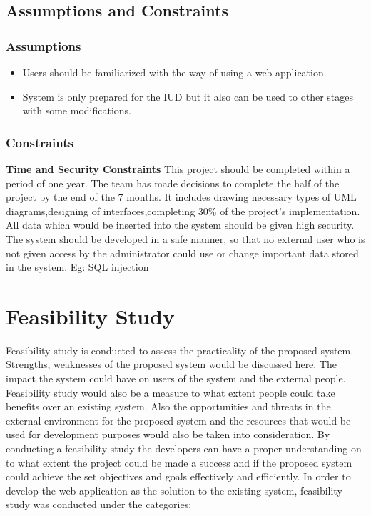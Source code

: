 \documentclass[a4paper,beamer]{article}
\begin{document}
	\subsection{Assumptions and Constraints}
	
	\subsubsection{Assumptions}
	\begin{itemize}
		\item Users should be familiarized with the way of using a web application.
		\item System is only prepared for the IUD but it also can be used to other stages with some modifications.
	\end{itemize}
	
	\subsubsection{Constraints}
	\textbf{Time and Security Constraints} \newline
	This project should be completed within a period of one year. The team has made decisions to complete the half of the project by the end of the 7  months. It includes drawing necessary types of UML diagrams,designing of interfaces,completing 30\% of the project’s implementation.\newline
	All data which would be inserted into the system should be given high security. The system should be developed in a safe manner, so that no external user who is not given access by the administrator could use or change important data stored in the system. Eg: SQL injection\newpage
	
	\section{Feasibility Study}
	Feasibility study is conducted to assess the practicality of the proposed system. Strengths, weaknesses of the proposed system would be discussed here. The impact the system could have on users of the system and the external people. Feasibility study would also be a measure to what extent people could take benefits over an existing system. Also the opportunities and threats in the external environment for the proposed system and the resources that would be used for development purposes would also be taken into consideration.\newline
	By conducting a feasibility study the developers can have a proper understanding on to what extent the project could be made a success and if the proposed system could achieve the set objectives and goals effectively and efficiently.\newline	
	In order to develop the web application as the solution to the existing system, feasibility study was conducted under the categories;
	
\end{document}
